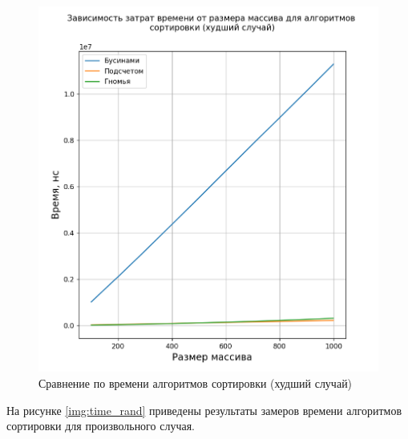 \begin{figure}[H]
	\begin{center}
		\includegraphics[scale=0.67]{img/time_worst.png}
	\end{center}
	\captionsetup{justification=centering}
	\caption{Сравнение по времени алгоритмов сортировки (худший случай)}
	\label{img:time_worst}
\end{figure}

На рисунке \ref{img:time_rand} приведены результаты замеров времени алгоритмов сортировки для произвольного случая.

